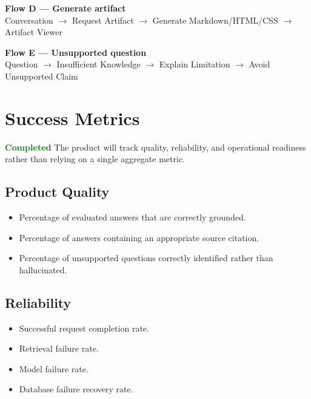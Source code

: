 \documentclass[11pt]{article}
\newcommand{\status}[1]{\textcolor{Green}{\textbf{#1}}}
\newcommand{\flowarrow}{\textcolor{Brand}{\ensuremath{\rightarrow}}}
\begin{document}
\begin{tcolorbox}[colback=SlatePale,colframe=Rule,boxrule=.6pt,arc=2mm]
\textbf{Flow D — Generate artifact}\\[0.2em]
Conversation \flowarrow{} Request Artifact \flowarrow{} Generate Markdown/HTML/CSS \flowarrow{} Artifact Viewer
\end{tcolorbox}

\begin{tcolorbox}[colback=AmberPale,colframe=Amber,boxrule=.6pt,arc=2mm]
\textbf{Flow E — Unsupported question}\\[0.2em]
Question \flowarrow{} Insufficient Knowledge \flowarrow{} Explain Limitation \flowarrow{} Avoid Unsupported Claim
\end{tcolorbox}

\section{Success Metrics}

\begin{statusbox}{\status{Completed}}
The product will track quality, reliability, and operational readiness rather than relying on a single aggregate metric.
\end{statusbox}

\subsection{Product Quality}
\begin{itemize}
  \item Percentage of evaluated answers that are correctly grounded.
  \item Percentage of answers containing an appropriate source citation.
  \item Percentage of unsupported questions correctly identified rather than hallucinated.
\end{itemize}

\subsection{Reliability}
\begin{itemize}
  \item Successful request completion rate.
  \item Retrieval failure rate.
  \item Model failure rate.
  \item Database failure recovery rate.
\end{itemize}
\end{document}
